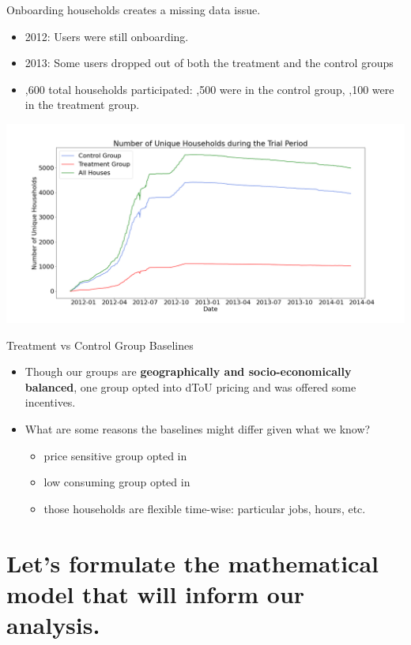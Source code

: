 \documentclass{beamer}
\begin{document}
\begin{frame}{Onboarding households creates a missing data issue.}
  \begin{itemize}
    \item 2012: Users were still onboarding.
    \item 2013: Some users dropped out of both the treatment and the control groups
    \item {},600 total households participated: ,500 were in the control group, ,100 were in the treatment group.
  \end{itemize}
  \vspace{-0.25cm}
  \includegraphics[width=1\textwidth]{images/house-count.png}
\end{frame}

\begin{frame}{Treatment vs Control Group Baselines}
  \begin{itemize}
    \item<+-> Though our groups are \textbf{geographically and socio-economically balanced}, one group opted into dToU pricing and was offered some incentives.
    \item<+-> What are some reasons the baselines might differ given what we know?
    \begin{itemize}
      \item<+-> price sensitive group opted in
      \item<+-> low consuming group opted in
      \item<+-> those households are flexible time-wise: particular jobs, hours, etc.\
    \end{itemize}
  \end{itemize}
\end{frame}

\section{Let's formulate the mathematical model that will inform our analysis.}
\end{document}
